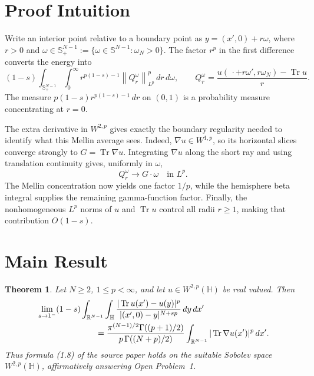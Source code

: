 \documentclass[11pt]{article}
\newtheorem{theorem}{Theorem}
\newcommand{\R}{\mathbb R}
\newcommand{\Hh}{\mathbb H}
\newcommand{\Sp}{\mathbb S^{N-1}_+}
\newcommand{\Tr}{\operatorname{Tr}}
\newcommand{\norm}[1]{\left\lVert #1\right\rVert}
\begin{document}
\section*{Proof Intuition}

Write an interior point relative to a boundary point as
\(y=(x',0)+r\omega\), where \(r>0\) and
\(\omega\in\Sp:=\{\omega\in\mathbb S^{N-1}:\omega_N>0\}\).
The factor \(r^p\) in the first difference converts the energy into
\[
 (1-s)\int_{\Sp}\int_0^\infty
 r^{p(1-s)-1}\norm{Q_r^\omega}_{L^p}^p\,dr\,d\omega,
 \qquad
 Q_r^\omega=
 \frac{u(\,\cdot+r\omega',r\omega_N)-\Tr u}{r}.
\]
The measure \(p(1-s)r^{p(1-s)-1}\,dr\) on \((0,1)\) is a probability
measure concentrating at \(r=0\).

The extra derivative in \(W^{2,p}\) gives exactly the boundary regularity
needed to identify what this Mellin average sees.  Indeed,
\(\nabla u\in W^{1,p}\), so its horizontal slices converge strongly to
\(G=\Tr\nabla u\).  Integrating \(\nabla u\) along the short ray and using
translation continuity gives, uniformly in \(\omega\),
\[
                       Q_r^\omega\longrightarrow G\cdot\omega
                       \quad\text{in }L^p.
\]
The Mellin concentration now yields one factor \(1/p\), while the
hemisphere beta integral supplies the remaining gamma-function factor.
Finally, the nonhomogeneous \(L^p\) norms of \(u\) and \(\Tr u\) control
all radii \(r\geq1\), making that contribution \(O(1-s)\).

\section*{Main Result}

\begin{theorem}\label{thm:main}
Let \(N\geq2\), \(1\leq p<\infty\), and let
\(u\in W^{2,p}(\Hh)\) be real valued.  Then
\begin{equation}\label{eq:main}
\begin{split}
 &\lim_{s\to1^-}(1-s)
 \int_{\R^{N-1}}\int_{\Hh}
 \frac{|\Tr u(x')-u(y)|^p}
 {|(x',0)-y|^{N+sp}}\,dy\,dx'
\\
 &\hspace{25mm}=
 \frac{\pi^{(N-1)/2}\Gamma((p+1)/2)}
 {p\,\Gamma((N+p)/2)}
 \int_{\R^{N-1}}|\Tr\nabla u(x')|^p\,dx'.
\end{split}
\end{equation}
Thus formula \emph{(1.8)} of the source paper holds on the suitable
Sobolev space \(W^{2,p}(\Hh)\), affirmatively answering Open Problem~1.
\end{theorem}
\end{document}
